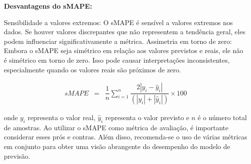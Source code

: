 \noindent\textbf{Desvantagens do sMAPE:}


Sensibilidade a valores extremos: O sMAPE é sensível a valores extremos nos dados. Se houver valores discrepantes que não representem a tendência geral, eles podem influenciar significativamente a métrica.	
Assimetria em torno de zero: Embora o sMAPE seja simétrico em relação aos valores previstos e reais, ele não é simétrico em torno de zero. Isso pode causar interpretações inconsistentes, especialmente quando os valores reais são próximos de zero.



\begin{eqnarray}
	sMAPE &=& \dfrac{1}{n} \sum_{i=1}^{n} \dfrac{2|y_i - \hat{y}_i|}{(|y_i| + |\hat{y}_i|)} \times 100\label{eq:smape}
\end{eqnarray}


\noindent onde $y_i$ representa o valor real, $\hat{y}_i$ representa o valor previsto e $n$ é o número total de amostras.
Ao utilizar o sMAPE como métrica de avaliação, é importante considerar esses prós e contras. Além disso, recomenda-se o uso de várias métricas em conjunto para obter uma visão abrangente do desempenho do modelo de previsão.




